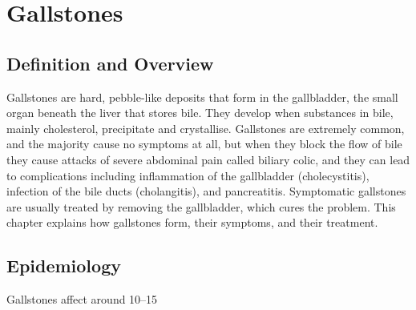 \chapter{Gallstones}

\section*{Definition and Overview}
Gallstones are hard, pebble-like deposits that form in the gallbladder, the small organ beneath the liver that stores bile. They develop when substances in bile, mainly cholesterol, precipitate and crystallise. Gallstones are extremely common, and the majority cause no symptoms at all, but when they block the flow of bile they cause attacks of severe abdominal pain called biliary colic, and they can lead to complications including inflammation of the gallbladder (cholecystitis), infection of the bile ducts (cholangitis), and pancreatitis. Symptomatic gallstones are usually treated by removing the gallbladder, which cures the problem. This chapter explains how gallstones form, their symptoms, and their treatment.

\section*{Epidemiology}
Gallstones affect around 10--15%

